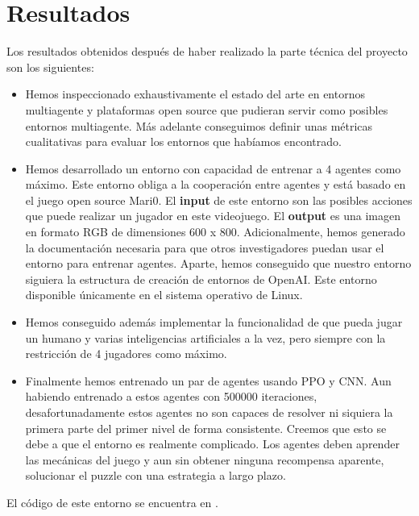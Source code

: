 \chapter{Resultados}

Los resultados obtenidos después de haber realizado la parte técnica del proyecto son los siguientes:
\begin{itemize}
    \item Hemos inspeccionado exhaustivamente el estado del arte en entornos multiagente y plataformas open source que pudieran servir como posibles entornos multiagente. Más adelante conseguimos definir unas métricas cualitativas para evaluar los entornos que habíamos encontrado.
    \item Hemos desarrollado un entorno con capacidad de entrenar a 4 agentes como máximo. Este entorno obliga a la cooperación entre agentes y está basado en el juego open source Mari0. El \textbf{input} de este entorno son las posibles acciones que puede realizar un jugador en este videojuego. El \textbf{output} es una imagen en formato RGB de dimensiones 600 x 800. Adicionalmente, hemos generado la documentación necesaria para que otros investigadores puedan usar el entorno para entrenar agentes. Aparte, hemos conseguido que nuestro entorno siguiera la estructura de creación de entornos de OpenAI. Este entorno disponible únicamente en el sistema operativo de Linux.
    \item Hemos conseguido además implementar la funcionalidad de que pueda jugar un humano y varias inteligencias artificiales a la vez, pero siempre con la restricción de 4 jugadores como máximo.
    \item Finalmente hemos entrenado un par de agentes usando PPO y CNN. Aun habiendo entrenado a estos agentes con 500000 iteraciones, desafortunadamente estos agentes no son capaces de resolver ni siquiera la primera parte del primer nivel de forma consistente. Creemos que esto se debe a que el entorno es realmente complicado. Los agentes deben aprender las mecánicas del juego y aun sin obtener ninguna recompensa aparente, solucionar el puzzle con una estrategia a largo plazo.

\end{itemize}

El código de este entorno se encuentra en \cite {repo}.
 

